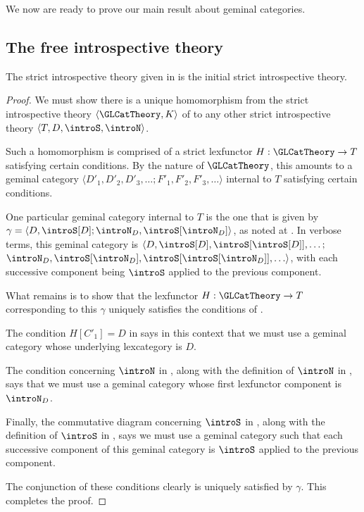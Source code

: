 We now are ready to prove our main result about geminal categories.

\subsection{The free introspective theory}
\begin{theorem}
The strict introspective theory given in  is the initial strict introspective theory.
\end{theorem}
\begin{proof}
We must show there is a unique homomorphism from the strict introspective theory $\langle \GLCatTheory, K \rangle$ of  to any other strict introspective theory $\langle T, D, \introS, \introN \rangle$.

Such a homomorphism is comprised of a strict lexfunctor $H : \GLCatTheory \to T$ satisfying certain conditions. By the nature of $\GLCatTheory$, this amounts to a geminal category $\langle D'_1, D'_2, D'_3, \ldots; F'_1, F'_2, F'_3, \ldots \rangle$ internal to $T$ satisfying certain conditions.

One particular geminal category internal to $T$ is the one that is given by $\gamma = \langle D, \introS[D]; \introN_D, \introS[\introN_D] \rangle$, as noted at . In verbose terms, this geminal category is $\langle D, \introS[D], \introS[\introS[D]], \ldots;$ $ \introN_D, \introS[\introN_D], \introS[\introS[\introN_D]], \ldots \rangle$, with each successive component being $\introS$ applied to the previous component.

What remains is to show that the lexfunctor $H : \GLCatTheory \to T$ corresponding to this $\gamma$ uniquely satisfies the conditions of .

The condition $H[C'_1] = D$ in  says in this context that we must use a geminal category whose underlying lexcategory is $D$.

The condition concerning $\introN$ in , along with the definition of $\introN$ in , says that we must use a geminal category whose first lexfunctor component is $\introN_{D}$.

Finally, the commutative diagram concerning $\introS$ in , along with the definition of $\introS$ in , says we must use a geminal category such that each successive component of this geminal category is $\introS$ applied to the previous component.

The conjunction of these conditions clearly is uniquely satisfied by $\gamma$. This completes the proof.
\end{proof}

